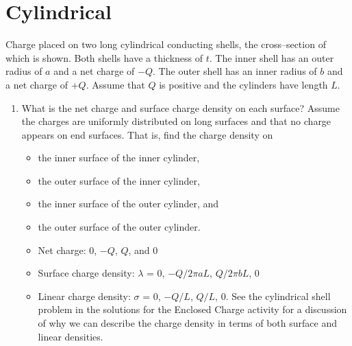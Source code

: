 \documentclass{article}
\begin{document}
\section{Cylindrical}

Charge placed on two long cylindrical conducting shells, the cross--section of which is shown. Both shells have a thickness of $t$. The inner shell has an outer radius of $a$ and a net charge of $-Q$. The outer shell has an inner radius of $b$ and a net charge of $+Q$. Assume that $Q$ is positive and the cylinders have length $L$.



\begin{enumerate}

  \item What is the net charge and surface charge density on each surface? Assume the charges are uniformly distributed on long surfaces and that no charge appears on end surfaces. That is, find the charge density on

    \begin{itemize}

      \item the inner surface of the inner cylinder,

      \item the outer surface of the inner cylinder,

      \item the inner surface of the outer cylinder, and

      \item the outer surface of the outer cylinder.

    \end{itemize}

      \begin{itemize}

        \item Net charge: $0$, $-Q$, $Q$, and $0$

        \item Surface charge density: $\lambda$ = $0$, $-Q/2\pi a L$, $Q/2\pi b L$, $0$

        \item Linear charge density: $\sigma$ = $0$, $-Q/L$, $Q/L$, $0$. See the cylindrical shell problem in the solutions for the Enclosed Charge activity for a discussion of why we can describe the charge density in terms of both surface and linear densities.

      \end{itemize}

\end{enumerate}
\end{document}
